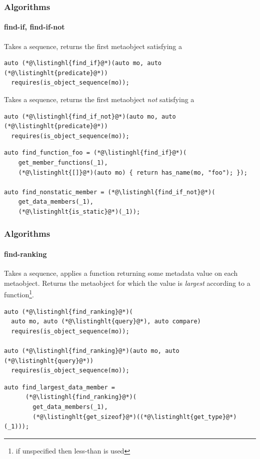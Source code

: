 \documentclass[compress,table,xcolor=table]{beamer}
\begin{document}
\begin{frame}[fragile]
  \frametitle{Algorithms}
  \framesubtitle{find-if, find-if-not}
  Takes a sequence, returns the first metaobject satisfying
  a 
  \begin{lstlisting}[language=c++2x]
auto (*@\listinghl{find_if}@*)(auto mo, auto (*@\listinghlt{predicate}@*))
  requires(is_object_sequence(mo));
  \end{lstlisting}
  \vfill
  Takes a sequence, returns the first metaobject {\em not} satisfying
  a 
  \begin{lstlisting}[language=c++2x]
auto (*@\listinghl{find_if_not}@*)(auto mo, auto (*@\listinghlt{predicate}@*))
  requires(is_object_sequence(mo));
  \end{lstlisting}
  \vfill
  \begin{lstlisting}[language=c++2x,basicstyle=\footnotesize\ttfamily]
auto find_function_foo = (*@\listinghl{find_if}@*)(
    get_member_functions(_1),
    (*@\listinghlt{[]}@*)(auto mo) { return has_name(mo, "foo"); });

auto find_nonstatic_member = (*@\listinghl{find_if_not}@*)(
    get_data_members(_1),
    (*@\listinghlt{is_static}@*)(_1));
  \end{lstlisting}
\end{frame}
\begin{frame}[fragile]
  \frametitle{Algorithms}
  \framesubtitle{find-ranking}
  Takes a sequence, applies a  function returning some metadata
  value on each metaobject.
  Returns the metaobject for which the value is {\em largest} according
  to a  function\footnote{if unspecified then less-than is used}.
  \begin{lstlisting}[language=c++2x]
auto (*@\listinghl{find_ranking}@*)(
  auto mo, auto (*@\listinghlt{query}@*), auto compare)
  requires(is_object_sequence(mo));

auto (*@\listinghl{find_ranking}@*)(auto mo, auto (*@\listinghlt{query}@*))
  requires(is_object_sequence(mo));
  \end{lstlisting}
  \vfill
  \begin{lstlisting}[language=c++2x,basicstyle=\footnotesize\ttfamily]
    auto find_largest_data_member =
      (*@\listinghl{find_ranking}@*)(
        get_data_members(_1),
        (*@\listinghlt{get_sizeof}@*)((*@\listinghlt{get_type}@*)(_1)));
  \end{lstlisting}
\end{frame}
\end{document}

